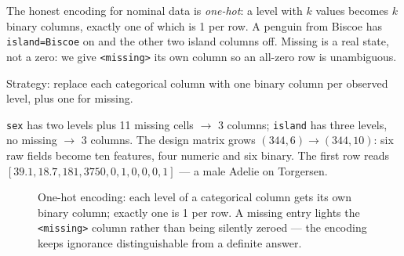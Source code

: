 The honest encoding for nominal data is \emph{one-hot}: a level with $k$
values becomes $k$ binary columns, exactly one of which is 1 per row. A penguin
from Biscoe has \texttt{island=Biscoe} on and the other two island columns off.
Missing is a real state, not a zero: we give \texttt{<missing>} its own column
so an all-zero row is unambiguous.





\begin{example}\label{ex:onehot-penguins}
Strategy: replace each categorical column with one binary column per observed
level, plus one for missing.\par
\begin{solution}
\texttt{sex} has two levels plus 11 missing cells $\to$ 3 columns;
\texttt{island} has three levels, no missing $\to$ 3 columns. The design
matrix grows $(344,6)\to(344,10)$: six raw fields become ten features, four
numeric and six binary. The first row reads $[39.1, 18.7, 181, 3750, 0, 1, 0,
0, 0, 1]$ --- a male Adelie on Torgersen.
\end{solution}
\end{example}

\begin{figure}[ht]\centering
{}
\caption{One-hot encoding: each level of a categorical column gets its own
binary column; exactly one is 1 per row. A missing entry lights the
\texttt{<missing>} column rather than being silently zeroed --- the encoding
keeps ignorance distinguishable from a definite
answer.}\label{fig:onehot-sketch}
\end{figure}

